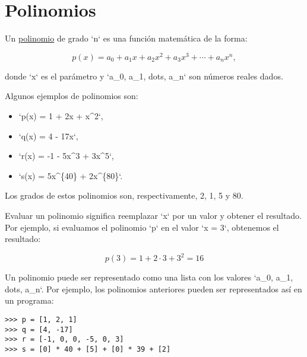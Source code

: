 \section{Polinomios}

Un \href{http://es.wikipedia.org/wiki/Polinomio}{polinomio} de grado `n`
es una función matemática de la forma:

\[p(x) = a_0 + a_1 x + a_2 x^2 + a_3 x^3 +
\cdots + a_n x^n,\]

donde `x` es el parámetro y `a\_0, a\_1, dots, a\_n` son números reales
dados.

Algunos ejemplos de polinomios son:

\begin{itemize}
\item
  `p(x) = 1 + 2x + x\^{}2`,
\item
  `q(x) = 4 - 17x`,
\item
  `r(x) = -1 - 5x\^{}3 + 3x\^{}5`,
\item
  `s(x) = 5x\^{}\{40\} + 2x\^{}\{80\}`.
\end{itemize}

Los grados de estos polinomios son, respectivamente, 2, 1, 5 y 80.

Evaluar un polinomio significa reemplazar `x` por un valor y obtener el
resultado. Por ejemplo, si evaluamos el polinomio `p` en el valor `x =
3`, obtenemos el resultado:

\[p(3) = 1 + 2\cdot 3 + 3^2 = 16\]

Un polinomio puede ser representado como una lista con los valores
`a\_0, a\_1, dots, a\_n`. Por ejemplo, los polinomios anteriores pueden
ser representados así en un programa:

\begin{lstlisting}
>>> p = [1, 2, 1]
>>> q = [4, -17]
>>> r = [-1, 0, 0, -5, 0, 3]
>>> s = [0] * 40 + [5] + [0] * 39 + [2]
\end{lstlisting}

